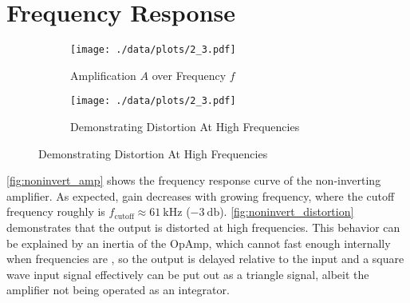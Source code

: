 \section{Frequency Response}
\begin{figure}[tbp]
	\centering
	\begin{subfigure}{0.4\textwidth}
		\centering
		\texttt{[image: ./data/plots/2\_3.pdf]}
		\caption{Amplification $A$ over Frequency $f$}
		\label{fig:noninvert_amp}
	\end{subfigure}
	\qquad\qquad
	\begin{subfigure}{0.4\textwidth}
		\centering
		\texttt{[image: ./data/plots/2\_3.pdf]}
		\caption{Demonstrating Distortion At High Frequencies}
		\label{fig:noninvert_distortion}
	\end{subfigure}
\end{figure}

\autoref{fig:noninvert_amp} shows the frequency response curve of the non-inverting amplifier.
As expected, gain decreases with growing frequency, where the cutoff frequency roughly is $f_\text{cutoff}\approx\SI{61}{\kilo\hertz}$ ($\SI{-3}{\decibel}$).
\autoref{fig:noninvert_distortion} demonstrates that the output is distorted at high frequencies.
This behavior can be explained by an inertia of the OpAmp, which cannot  fast enough internally when frequencies are , so the output is delayed relative to the input and a square wave input signal effectively can be put out as a triangle signal, albeit the amplifier not being operated as an integrator.
